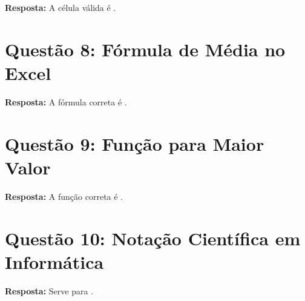 \documentclass{article}
\begin{document}
\textbf{Resposta:} A célula válida é .

\section*{Questão 8: Fórmula de Média no Excel}

\textbf{Resposta:} A fórmula correta é .

\section*{Questão 9: Função para Maior Valor}

\textbf{Resposta:} A função correta é .

\section*{Questão 10: Notação Científica em Informática}

\textbf{Resposta:} Serve para .
\end{document}
